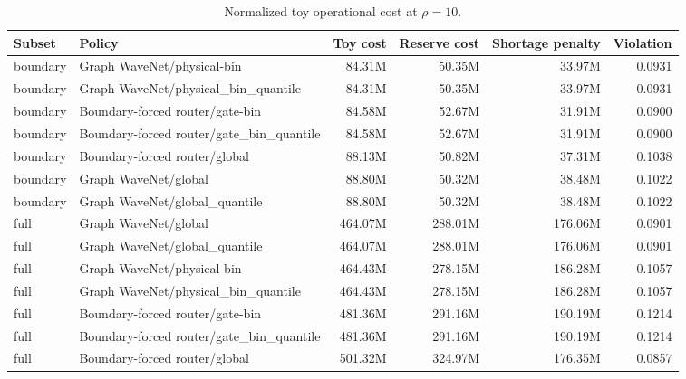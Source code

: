 \begin{table}[H]
\centering
\footnotesize
\setlength{\tabcolsep}{4pt}
\renewcommand{\arraystretch}{1.08}
\caption{Normalized toy operational cost at $\rho=10$.}
\begin{tabular}{llrrrr}
\toprule
Subset & Policy & Toy cost & Reserve cost & Shortage penalty & Violation \\
\midrule
boundary & Graph WaveNet/physical-bin & 84.31M & 50.35M & 33.97M & 0.0931 \\
boundary & Graph WaveNet/physical\_bin\_quantile & 84.31M & 50.35M & 33.97M & 0.0931 \\
boundary & Boundary-forced router/gate-bin & 84.58M & 52.67M & 31.91M & 0.0900 \\
boundary & Boundary-forced router/gate\_bin\_quantile & 84.58M & 52.67M & 31.91M & 0.0900 \\
boundary & Boundary-forced router/global & 88.13M & 50.82M & 37.31M & 0.1038 \\
boundary & Graph WaveNet/global & 88.80M & 50.32M & 38.48M & 0.1022 \\
boundary & Graph WaveNet/global\_quantile & 88.80M & 50.32M & 38.48M & 0.1022 \\
full & Graph WaveNet/global & 464.07M & 288.01M & 176.06M & 0.0901 \\
full & Graph WaveNet/global\_quantile & 464.07M & 288.01M & 176.06M & 0.0901 \\
full & Graph WaveNet/physical-bin & 464.43M & 278.15M & 186.28M & 0.1057 \\
full & Graph WaveNet/physical\_bin\_quantile & 464.43M & 278.15M & 186.28M & 0.1057 \\
full & Boundary-forced router/gate-bin & 481.36M & 291.16M & 190.19M & 0.1214 \\
full & Boundary-forced router/gate\_bin\_quantile & 481.36M & 291.16M & 190.19M & 0.1214 \\
full & Boundary-forced router/global & 501.32M & 324.97M & 176.35M & 0.0857 \\
\bottomrule
\end{tabular}
\end{table}
